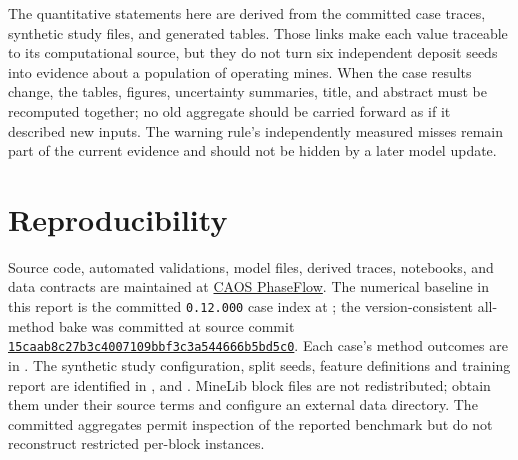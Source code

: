 \documentclass[11pt]{article}
\begin{document}
The quantitative statements here are derived from the committed case traces, synthetic study files, and generated tables. Those links make each value traceable to its computational source, but they do not turn six independent deposit seeds into evidence about a population of operating mines. When the case results change, the tables, figures, uncertainty summaries, title, and abstract must be recomputed together; no old aggregate should be carried forward as if it described new inputs. The warning rule's independently measured misses remain part of the current evidence and should not be hidden by a later model update.
\section{Reproducibility}
Source code, automated validations, model files, derived traces, notebooks, and data contracts are maintained at \href{https://github.com/fsantibanezleal/CAOS_PhaseFlow}{CAOS PhaseFlow}. The numerical baseline in this report is the committed \texttt{0.12.000} case index at ; the version-consistent all-method bake was committed at source commit \href{https://github.com/fsantibanezleal/CAOS_PhaseFlow/commit/15caab8c27b3c4007109bbf3c3a544666b5bd5c0}{\texttt{15caab8c27b3c4007109bbf3c3a544666b5bd5c0}}. Each case's method outcomes are in . The synthetic study configuration, split seeds, feature definitions and training report are identified in ,  and . MineLib block files are not redistributed; obtain them under their source terms and configure an external data directory. The committed aggregates permit inspection of the reported benchmark but do not reconstruct restricted per-block instances.
\end{document}
